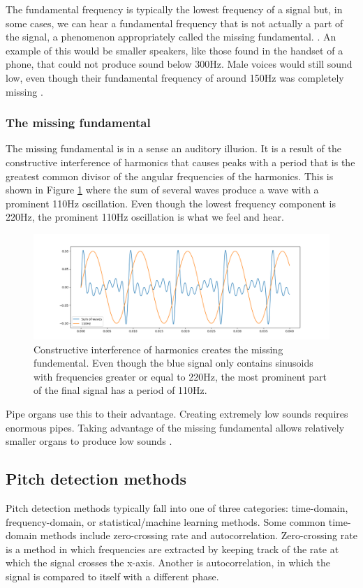 The fundamental frequency is typically the lowest frequency of a signal but, in some cases, we can hear a fundamental frequency that is not actually a part of the signal, a phenomenon appropriately called the missing fundamental. \cite{Gotsopoulos}. An example of this would be smaller speakers, like those found in the handset of a phone, that could not produce sound below 300Hz. Male voices would still sound low, even though their fundamental frequency of around 150Hz was completely missing \cite{Mather2009}.

\subsubsection{The missing fundamental}
The missing fundamental is in a sense an auditory illusion. It is a result of the constructive interference of harmonics that causes peaks with a period that is the greatest common divisor of the angular frequencies of the harmonics. This is shown in Figure \ref{fig:missingfund} where the sum of several waves produce a wave with a prominent 110Hz oscillation. Even though the lowest frequency component is 220Hz, the prominent 110Hz oscillation is what we feel and hear.

\begin{figure}[ht]
    \centering
    \includegraphics[width=\textwidth]{./images/missingfund.png}
    \caption{Constructive interference of harmonics creates the missing fundemental. Even though the blue signal only contains sinusoids with frequencies greater or equal to 220Hz, the most prominent part of the final signal has a period of 110Hz. \label{fig:missingfund}}
\end{figure}

Pipe organs use this to their advantage. Creating extremely low sounds requires enormous pipes. Taking advantage of the missing fundamental allows relatively smaller organs to produce low sounds \cite{Veritasium2024}.

\subsection{Pitch detection methods}
Pitch detection methods typically fall into one of three categories: time-domain, frequency-domain, or statistical/machine learning methods. Some common time-domain methods include zero-crossing rate and autocorrelation. Zero-crossing rate is a method in which frequencies are extracted by keeping track of the rate at which the signal crosses the x-axis. Another is autocorrelation, in which the signal is compared to itself with a different phase. 


